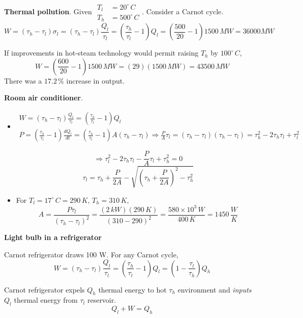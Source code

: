  \textbf{Thermal pollution}.  Given $\begin{aligned} T_l & = 20^{\circ} \, C \\ T_h & = 500^{\circ} \, C \end{aligned}$.  Consider a Carnot cycle.  
\[
W = (\tau_h - \tau_l )\sigma_l = (\tau_h - \tau_l) \frac{Q_l}{\tau_l} = \left( \frac{\tau_h}{\tau_l} - 1 \right) Q_l = \left( \frac{500}{20} - 1 \right) 1500 \, MW = \boxed{ 36000 MW }
\]

If improvements in hot-steam technology would permit raising $T_h$ by $100^{\circ} \, C$, 
\[
W = \left( \frac{600}{20}  -1 \right) 1500 \, MW = (29)(1500 \, MW)  = 43500 \, MW 
\]
There was a $17.2 \, \%$ increase in output.  





 \textbf{Room air conditioner}.  \begin{itemize}
\item[(a)] \[
\begin{gathered}
  W = (\tau_h - \tau_l) \frac{Q_l}{\tau_l} = \left( \frac{\tau_h }{\tau_l }- 1 \right)Q_ l \\
  P = \left( \frac{\tau_h}{\tau_l} - 1 \right) \frac{dQ_l}{dt} = \left( \frac{\tau_h }{\tau_l }-1 \right) A (\tau_h - \tau_l ) \Longrightarrow \frac{P}{A} \tau_l = (\tau_h - \tau_l )(\tau_h - \tau_l) = \tau_h^2 - 2\tau_h \tau_l + \tau_l^2
\end{gathered}
\]

\[
\Longrightarrow \tau_l^2 - 2\tau_h \tau_l  - \frac{P}{A} \tau_l + \tau_h^2 = 0 
\]
\[
\boxed{ \tau_l = \tau_h + \frac{P}{2A} - \sqrt{ (\tau_h + \frac{P}{2A} )^2 - \tau_h^2 } }
\]
\item[(b)] For $T_l = 17^{\circ} \, C = 290 \, K$, $T_h = 310 \, K$, 
\[
A = \frac{P\tau_l }{ (\tau_h - \tau_l)^2 } = \frac{ ( 2 \, kW )(290 \, K) }{ (310 - 290)^2 } = \frac{580 \times 10^3 \, W }{ 400 \, K } = \boxed{ 1450 \, \frac{W}{K} }
\]
\end{itemize}






 \textbf{Light bulb in a refrigerator}

Carnot refrigerator draws 100 W.  For any Carnot cycle,
\[
W = (\tau_h - \tau_l) \frac{Q_l}{\tau_l} = \left( \frac{\tau_h }{\tau_l } - 1 \right) Q_l = \left( 1 - \frac{\tau_l }{\tau_h} \right) Q_h 
\]

Carnot refrigerator expels $Q_h$ thermal energy to hot $\tau_h$ environment and \emph{inputs} $Q_l$ thermal energy from $\tau_l$ reservoir.  
\[
Q_l + W = Q_h
\]

